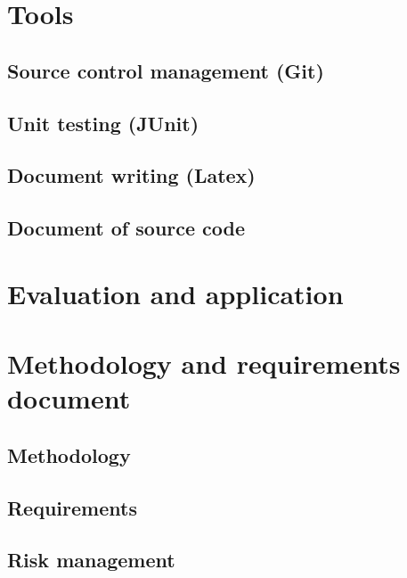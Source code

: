 \documentclass{article}
\begin{document}
\section{Tools}
\label{sec:Tools}

\subsection{Source control management (Git)}
\label{sec:scm}

\subsection{Unit testing (JUnit)}
\label{sec:junit}

\subsection{Document writing (Latex)}
\label{sec:latex}

\subsection{Document of source code}
\label{sec:documentsource}


\section{Evaluation and application}
\label{sec:eval}


\section{Methodology and requirements document}
\label{sec:methrecdoc}

\subsection{Methodology}
\label{sec:meth}

\subsection{Requirements}
\label{sec:req}


\subsection{Risk management}
\label{sec:riskman}
\end{document}
